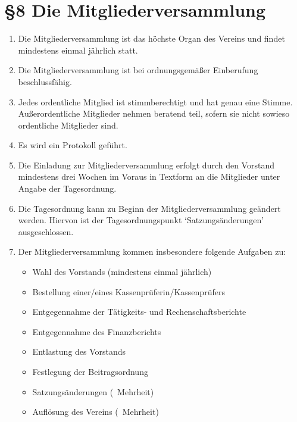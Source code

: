 \documentclass[11pt,ngerman]{article}
\begin{document}
\section*{§8 Die Mitgliederversammlung}
\begin{enumerate}
 \item Die Mitgliederversammlung ist das höchste Organ des Vereins und findet mindestens einmal jährlich statt.
 \item Die Mitgliederversammlung ist bei ordnungsgemäßer Einberufung beschlussfähig.
 \item Jedes ordentliche Mitglied ist stimmberechtigt und hat genau eine Stimme. Außerordentliche Mitglieder nehmen beratend teil, sofern sie nicht sowieso ordentliche Mitglieder sind.
 \item Es wird ein Protokoll geführt.
 \item Die Einladung zur Mitgliederversammlung erfolgt durch den Vorstand mindestens drei Wochen im Voraus in Textform an die Mitglieder unter Angabe der Tagesordnung.
 \item Die Tagesordnung kann zu Beginn der Mitgliederversammlung geändert werden. Hiervon ist der Tagesordnungspunkt `Satzungsänderungen' ausgeschlossen.
 \item Der Mitgliederversammlung kommen insbesondere folgende Aufgaben zu:
 \begin{itemize}
  \item Wahl des Vorstands (mindestens einmal jährlich)
  \item Bestellung einer/eines Kassenprüferin/Kassenprüfers
  \item Entgegennahme der Tätigkeits- und Rechenschaftsberichte
  \item Entgegennahme des Finanzberichts
  \item Entlastung des Vorstands
  \item Festlegung der Beitragsordnung
  \item Satzungsänderungen (\ Mehrheit)
  \item Auflösung des Vereins (\ Mehrheit)
 \end{itemize}
\end{enumerate}
\end{document}
